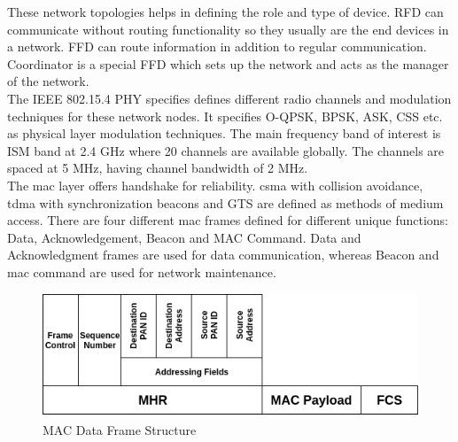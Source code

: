 These network topologies helps in defining the role and type of device.
\ac{RFD} can communicate without routing functionality so they usually are the end devices in a network.
\ac{FFD} can route information in addition to regular communication.
Coordinator is a special \ac{FFD} which sets up the network and acts as the manager of the network.\\

The IEEE 802.15.4 \ac{PHY} specifies defines different radio channels and modulation techniques for these network nodes.
It specifies \ac{O-QPSK}, \ac{BPSK}, \ac{ASK}, \ac{CSS} etc. as physical layer modulation techniques.
The main frequency band of interest is ISM band at 2.4 GHz where 20  channels are available globally.
The channels are spaced at 5 MHz, having channel bandwidth of 2 MHz.\\

The \ac{mac} layer offers handshake for reliability.
\ac{csma} with collision avoidance, \ac{tdma} with synchronization beacons and \ac{GTS} are defined as methods of medium access.
There are four different \ac{mac} frames defined for different unique functions: Data, Acknowledgement, Beacon and MAC Command.
Data and Acknowledgment frames are used for data communication, whereas Beacon and \ac{mac} command are used for network maintenance.\\

\begin{figure}[h!]
\centering
\includegraphics[scale=0.6]{Figure/DataFrame.png}
\caption{MAC Data Frame Structure}
\label{data_frame}
\end{figure}

